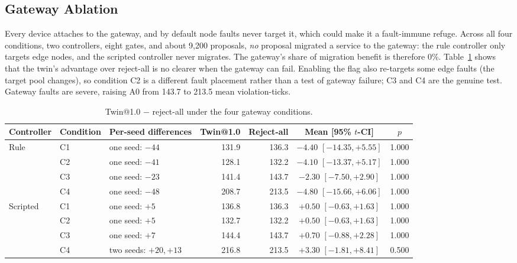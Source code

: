 \documentclass[conference]{IEEEtran}
\begin{document}
\subsection{Gateway Ablation}

Every device attaches to the gateway, and by default node faults never target it, which could make it a fault-immune refuge. Across all four conditions, two controllers, eight gates, and about 9,200 proposals, \emph{no} proposal migrated a service to the gateway: the rule controller only targets edge nodes, and the scripted controller never migrates. The gateway's share of migration benefit is therefore 0\%. Table~\ref{tab:gateway} shows that the twin's advantage over reject-all is no clearer when the gateway can fail. Enabling the flag also re-targets some edge faults (the target pool changes), so condition C2 is a different fault placement rather than a test of gateway failure; C3 and C4 are the genuine test. Gateway faults are severe, raising A0 from 143.7 to 213.5 mean violation-ticks.

\begin{table}[t]
\centering
\caption{Twin@1.0 $-$ reject-all under the four gateway conditions.}
\label{tab:gateway}
\small
\setlength{\tabcolsep}{4pt}
\begin{tabular}{@{}lllrrcc@{}}
\toprule
Controller & Condition & Per-seed differences & Twin@1.0 & Reject-all & Mean [95\% $t$-CI] & $p$ \\
\midrule
\multirow{4}{*}{Rule}
 & C1 & one seed: $-44$ & 131.9 & 136.3 & $-4.40$ $[-14.35, +5.55]$ & 1.000 \\
 & C2 & one seed: $-41$ & 128.1 & 132.2 & $-4.10$ $[-13.37, +5.17]$ & 1.000 \\
 & C3 & one seed: $-23$ & 141.4 & 143.7 & $-2.30$ $[-7.50, +2.90]$ & 1.000 \\
 & C4 & one seed: $-48$ & 208.7 & 213.5 & $-4.80$ $[-15.66, +6.06]$ & 1.000 \\
\midrule
\multirow{4}{*}{Scripted}
 & C1 & one seed: $+5$ & 136.8 & 136.3 & $+0.50$ $[-0.63, +1.63]$ & 1.000 \\
 & C2 & one seed: $+5$ & 132.7 & 132.2 & $+0.50$ $[-0.63, +1.63]$ & 1.000 \\
 & C3 & one seed: $+7$ & 144.4 & 143.7 & $+0.70$ $[-0.88, +2.28]$ & 1.000 \\
 & C4 & two seeds: $+20, +13$ & 216.8 & 213.5 & $+3.30$ $[-1.81, +8.41]$ & 0.500 \\
\bottomrule
\end{tabular}
\end{table}
\end{document}
